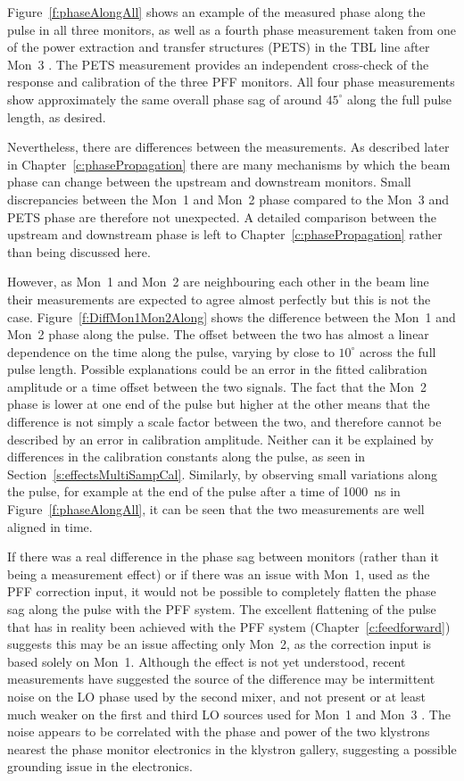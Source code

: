 Figure~\ref{f:phaseAlongAll} shows an example of the measured phase along the pulse in all three monitors, as well as a fourth phase measurement taken from one of the power extraction and transfer structures (PETS) in the TBL line after Mon~3 \cite{reidarPETS}. The PETS measurement provides an independent cross-check of the response and calibration of the three PFF monitors. All four phase measurements show approximately the same overall phase sag of around \(45^\circ\) along the full pulse length, as desired.

Nevertheless, there are differences between the measurements. As described later in Chapter~\ref{c:phasePropagation} there are many mechanisms by which the beam phase can change between the upstream and downstream monitors. Small discrepancies between the Mon~1 and Mon~2 phase compared to the Mon~3 and PETS phase are therefore not unexpected. A detailed comparison between the upstream and downstream phase is left to Chapter~\ref{c:phasePropagation} rather than being discussed here. 

However, as Mon~1 and Mon~2 are neighbouring each other in the beam line their measurements are expected to agree almost perfectly but this is not the case. Figure~\ref{f:DiffMon1Mon2Along} shows the difference between the Mon~1 and Mon~2 phase along the pulse. The offset between the two has almost a linear dependence on the time along the pulse, varying by close to \(10^\circ\) across the full pulse length. Possible explanations could be an error in the fitted calibration amplitude or a time offset between the two signals. The fact that the Mon~2 phase is lower at one end of the pulse but higher at the other means that the difference is not simply a scale factor between the two, and therefore cannot be described by an error in calibration amplitude. Neither can it be explained by differences in the calibration constants along the pulse, as seen in Section~\ref{s:effectsMultiSampCal}. Similarly, by observing small variations along the pulse, for example at the end of the pulse after a time of 1000~ns in Figure~\ref{f:phaseAlongAll}, it can be seen that the two measurements are well aligned in time.

If there was a real difference in the phase sag between monitors (rather than it being a measurement effect) or if there was an issue with Mon~1, used as the PFF correction input, it would not be possible to completely flatten the phase sag along the pulse with the PFF system. The excellent flattening of the pulse that has in reality been achieved with the PFF system (Chapter~\ref{c:feedforward}) suggests this may be an issue affecting only Mon~2, as the correction input is based solely on Mon~1. Although the effect is not yet understood, recent measurements have suggested the source of the difference may be intermittent noise on the LO phase used by the second mixer, and not present or at least much weaker on the first and third LO sources used for Mon~1 and Mon~3 \cite{jackFONTAug16}. The noise appears to be correlated with the phase and power of the two klystrons nearest the phase monitor electronics in the klystron gallery, suggesting a possible grounding issue in the electronics.

